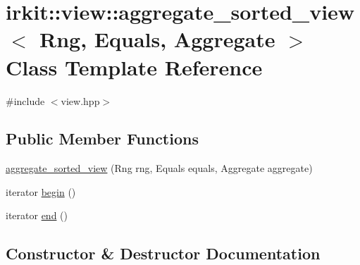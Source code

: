 \hypertarget{classirkit_1_1view_1_1aggregate__sorted__view}{}\section{irkit\+:\+:view\+:\+:aggregate\+\_\+sorted\+\_\+view$<$ Rng, Equals, Aggregate $>$ Class Template Reference}
\label{classirkit_1_1view_1_1aggregate__sorted__view}


{\ttfamily \#include $<$view.\+hpp$>$}

\subsection*{Public Member Functions}
\begin{DoxyCompactItemize}
\item 
\mbox{\hyperlink{classirkit_1_1view_1_1aggregate__sorted__view_ac4bb5feea5faf3bc58d662bd5c8d4de5}{aggregate\+\_\+sorted\+\_\+view}} (Rng rng, Equals equals, Aggregate aggregate)
\item 
iterator \mbox{\hyperlink{classirkit_1_1view_1_1aggregate__sorted__view_a6e45f5ee40da2b8f4fed52e0b8fec8de}{begin}} ()
\item 
iterator \mbox{\hyperlink{classirkit_1_1view_1_1aggregate__sorted__view_ae49c7357a20d9b26eec64f28c2834585}{end}} ()
\end{DoxyCompactItemize}


\subsection{Constructor \& Destructor Documentation}
\mbox{\label{classirkit_1_1view_1_1aggregate__sorted__view_ac4bb5feea5faf3bc58d662bd5c8d4de5}} 
